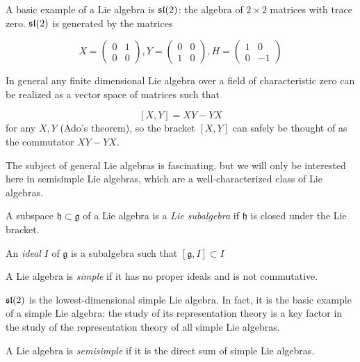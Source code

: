 A basic example of a Lie algebra is $\mathfrak{sl}(2)$: the algebra of $2 \times 2$
matrices with trace zero. $\mathfrak{sl}(2)$ is generated by the matrices 

\begin{equation}
    X = \begin{pmatrix} 0 & 1 \\ 0 & 0 \end{pmatrix},
    Y = \begin{pmatrix} 0 & 0 \\ 1 & 0 \end{pmatrix}, 
    H = \begin{pmatrix} 1 & 0 \\ 0 &-1 \end{pmatrix}
\end{equation}

In general any finite dimensional Lie algebra over a
field of characteristic zero can be realized as a vector space of matrices such
that 

\[ \left[ X,Y \right] = XY - YX\] 
for any $X,Y$ (Ado's theorem), so the bracket $[X,Y]$ can safely be thought of
as the commutator $XY - YX$. 


The subject of general Lie algebras is fascinating, but we will only be
interested here in semisimple Lie algebras, which are a well-characterized
class of Lie algebras. 

\begin{defn}
    A subspace $\mathfrak{h} \subset \mathfrak{g}$ of a Lie algebra is a
    \emph{Lie subalgebra} if $\mathfrak{h}$ is closed under the Lie bracket. 

    An \emph{ideal} $I$ of $\mathfrak{g}$ is a subalgebra such that $[\mathfrak{g}, I] \subset I$
\end{defn}

\begin{defn}
    A Lie algebra is \emph{simple} if it has no proper ideals and is not
    commutative. 
\end{defn}

$\mathfrak{sl}(2)$ is the lowest-dimensional simple Lie algebra. In fact, it is the
basic example of a simple Lie algebra: the study of its representation theory
is a key factor in the study of the representation theory of all simple Lie
algebras.

\begin{defn}
    A Lie algebra is \emph{semisimple} if it is the direct sum of simple Lie algebras.
\end{defn}

